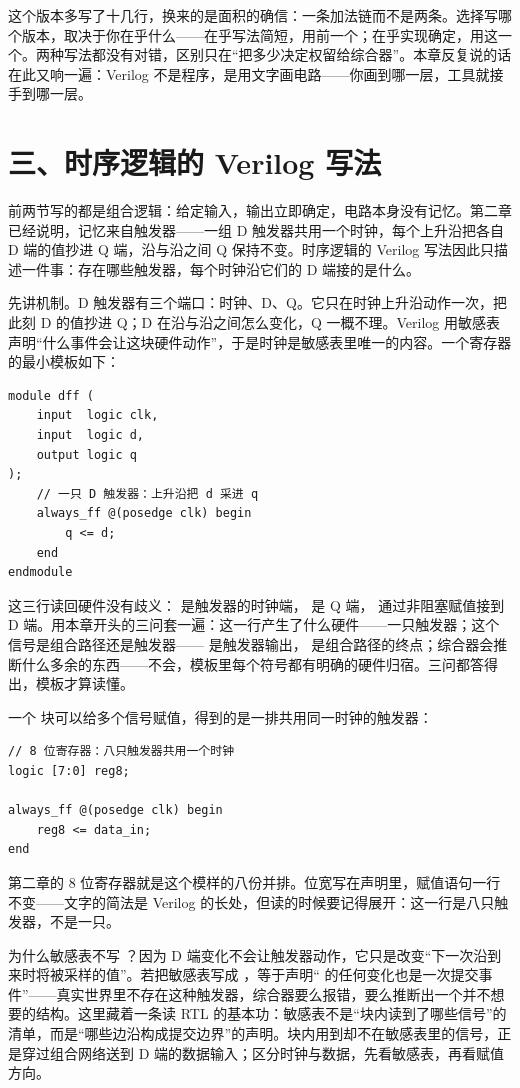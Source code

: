 这个版本多写了十几行，换来的是面积的确信：一条加法链而不是两条。选择写哪个版本，取决于你在乎什么——在乎写法简短，用前一个；在乎实现确定，用这一个。两种写法都没有对错，区别只在“把多少决定权留给综合器”。本章反复说的话在此又响一遍：Verilog 不是程序，是用文字画电路——你画到哪一层，工具就接手到哪一层。

\section{三、时序逻辑的 Verilog 写法}

前两节写的都是组合逻辑：给定输入，输出立即确定，电路本身没有记忆。第二章已经说明，记忆来自触发器——一组 D 触发器共用一个时钟，每个上升沿把各自 D 端的值抄进 Q 端，沿与沿之间 Q 保持不变。时序逻辑的 Verilog 写法因此只描述一件事：存在哪些触发器，每个时钟沿它们的 D 端接的是什么。


先讲机制。D 触发器有三个端口：时钟、D、Q。它只在时钟上升沿动作一次，把此刻 D 的值抄进 Q；D 在沿与沿之间怎么变化，Q 一概不理。Verilog 用敏感表声明“什么事件会让这块硬件动作”，于是时钟是敏感表里唯一的内容。一个寄存器的最小模板如下：

\begin{lstlisting}
module dff (
    input  logic clk,
    input  logic d,
    output logic q
);
    // 一只 D 触发器：上升沿把 d 采进 q
    always_ff @(posedge clk) begin
        q <= d;
    end
endmodule
\end{lstlisting}

这三行读回硬件没有歧义： 是触发器的时钟端， 是 Q 端， 通过非阻塞赋值接到 D 端。用本章开头的三问套一遍：这一行产生了什么硬件——一只触发器；这个信号是组合路径还是触发器—— 是触发器输出， 是组合路径的终点；综合器会推断什么多余的东西——不会，模板里每个符号都有明确的硬件归宿。三问都答得出，模板才算读懂。

一个  块可以给多个信号赋值，得到的是一排共用同一时钟的触发器：

\begin{lstlisting}
// 8 位寄存器：八只触发器共用一个时钟
logic [7:0] reg8;

always_ff @(posedge clk) begin
    reg8 <= data_in;
end
\end{lstlisting}

第二章的 8 位寄存器就是这个模样的八份并排。位宽写在声明里，赋值语句一行不变——文字的简法是 Verilog 的长处，但读的时候要记得展开：这一行是八只触发器，不是一只。

为什么敏感表不写 ？因为 D 端变化不会让触发器动作，它只是改变“下一次沿到来时将被采样的值”。若把敏感表写成 ，等于声明“ 的任何变化也是一次提交事件”——真实世界里不存在这种触发器，综合器要么报错，要么推断出一个并不想要的结构。这里藏着一条读 RTL 的基本功：敏感表不是“块内读到了哪些信号”的清单，而是“哪些边沿构成提交边界”的声明。块内用到却不在敏感表里的信号，正是穿过组合网络送到 D 端的数据输入；区分时钟与数据，先看敏感表，再看赋值方向。

